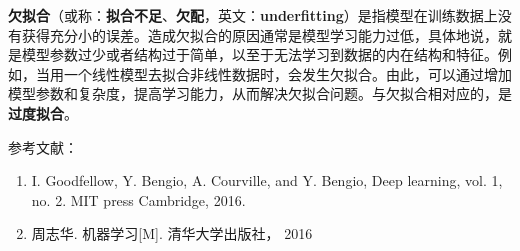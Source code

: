 

\textbf{欠拟合}（或称：\textbf{拟合不足}、\textbf{欠配}，英文：\textbf{underfitting}）是指模型在训练数据上没有获得充分小的误差。造成欠拟合的原因通常是模型学习能力过低，具体地说，就是模型参数过少或者结构过于简单，以至于无法学习到数据的内在结构和特征。例如，当用一个线性模型去拟合非线性数据时，会发生欠拟合。由此，可以通过增加模型参数和复杂度，提高学习能力，从而解决欠拟合问题。与欠拟合相对应的，是\textbf{过度拟合}。



参考文献：
\begin{enumerate}
\item I. Goodfellow, Y. Bengio, A. Courville, and Y. Bengio, Deep learning, vol. 1, no. 2. MIT press Cambridge, 2016.
\item 周志华. 机器学习[M]. 清华大学出版社， 2016
\end{enumerate}
